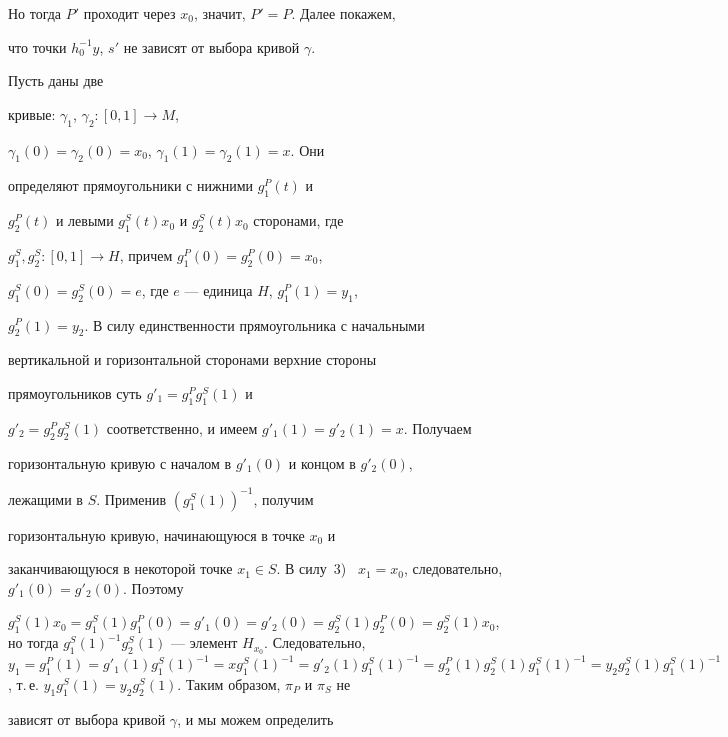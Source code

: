 \begin{pf}
Но тогда $P'$ проходит через $x_0$, значит, $P'=P$. Далее покажем,


что точки $h_0^{-1} y$, $s'$ не зависят от выбора кривой $\gamma$.





Пусть даны две


кривые: $\gamma_1$, $\gamma_2 : [0,1] \to M$,


$\gamma_1(0)=\gamma_2(0)=x_0$, $\gamma_1(1)=\gamma_2(1)=x$. Они


определяют прямоугольники с нижними $g_1^P(t)$ и


$g_2^P(t)$ и левыми $g_1^S(t) x_0$ и $g_2^S(t) x_0$ сторонами, где


$g_1^S, g_2^S : [0,1] \to H$, причем $g_1^P(0)=g_2^P(0)=x_0$,


$g_1^S(0) =g_2^S(0) = e$, где $e$ --- единица $H$, $g_1^P(1)=y_1$,


$g_2^P(1)=y_2$. В силу единственности прямоугольника с начальными


вертикальной и горизонтальной сторонами верхние стороны


прямоугольников суть $g'_1=g_1^P g_1^S(1)$ и


$g'_2=g_2^P g_2^S(1)$ соответственно, и имеем $g'_1(1)=g'_2(1)=x$. Получаем


горизонтальную кривую с началом в $g'_1(0)$ и концом в  $g'_2(0)$,


лежащими в $S$. Применив  $(g_1^S(1))^{-1}$, получим


горизонтальную кривую, начинающуюся в точке $x_0$ и


заканчивающуюся в некоторой точке $x_1 \in S$. В силу~3) \ $x_1 =


x_0$, следовательно, $g'_1(0) = g'_2(0)$. Поэтому


 $ g_1^S(1) x_0 = g_1^S(1) g_1^P(0)  = g'_1(0)=g'_2(0)=


g_2^S(1) g_2^P(0) =  g_2^S(1) x_0$, но тогда $g_1^S(1)^{-1}


g_2^S(1)$ --- элемент $H_{x_0}$. Следовательно, $y_1=g_1^P(1)=g'_1(1)


g_1^S(1)^{-1}=x g_1^S(1)^{-1}= g'_2(1) g_1^S(1)^{-1}=g_2^P(1)


g_2^S(1) g_1^S(1)^{-1}=y_2 g_2^S(1) g_1^S(1)^{-1}$, т.\,е. $y_1


g_1^S(1) =  y_2 g_2^S(1)$. Таким образом, $\pi_P$ и $\pi_S$ не


зависят от выбора кривой $\gamma$, и мы можем определить



\end{pf}
